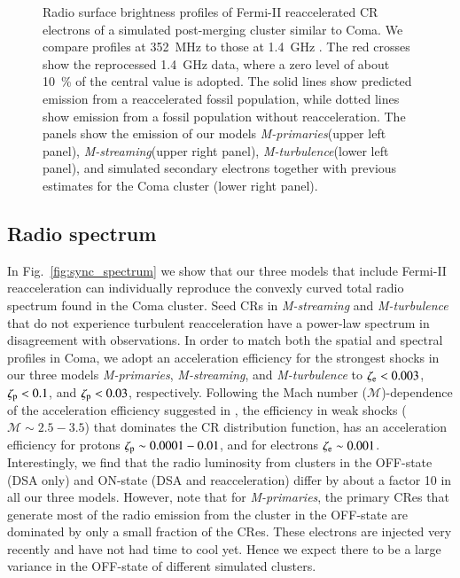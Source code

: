 \documentclass[a4paper,fleqn,usenatbib]{mnras}
\newcommand{\Mstream}{{\it M-streaming}\xspace}
\newcommand{\Mflatturb}{{\it M-turbulence}\xspace}
\newcommand{\Mprimary}{{\it M-primaries}\xspace}
\begin{document}
\begin{figure}
\begin{minipage}{1\columnwidth}
\begin{center}
   \end{center}
\end{minipage}
\caption{Radio surface brightness profiles of Fermi-II reaccelerated
  CR electrons of a simulated post-merging cluster similar to Coma. We
  compare profiles at 352~MHz \citep[blue lines and
    crosses,][]{brown11} to those at 1.4~GHz \citep[green lines and
    crosses,][]{deiss97}. The red crosses show the reprocessed 1.4~GHz
  data, where a zero level of about 10~\% of the central value is
  adopted. The solid lines show predicted emission from a
  reaccelerated fossil population, while dotted lines show emission
  from a fossil population without reacceleration. The panels show the
  emission of our models \Mprimary (upper left panel), \Mstream (upper
  right panel), \Mflatturb (lower left panel), and simulated secondary
  electrons together with previous estimates \citep{brunetti12} for
  the Coma cluster (lower right panel).}
  \label{fig:sync_profile}
\end{figure}

\subsection{Radio spectrum}
In Fig.~\ref{fig:sync_spectrum} we show that our three models that
include Fermi-II reacceleration can individually reproduce the
convexly curved total radio spectrum found in the Coma cluster. Seed
CRs in \Mstream and \Mflatturb that do not experience turbulent
reacceleration have a power-law spectrum in disagreement with
observations. In order to match both the spatial and spectral profiles
in Coma, we adopt an acceleration efficiency for the strongest shocks
in our three models \Mprimary, \Mstream, and \Mflatturb to
$\zeta_{{\mathrm{e}}} <0.003$, $\zeta_{{\mathrm{p}}} < 0.1$, and
$\zeta_{{\mathrm{p}}}<0.03$, respectively. Following the Mach number
($\mathcal{M}$)-dependence of the acceleration efficiency suggested in
\cite{pinzke13}, the efficiency in weak shocks ($\mathcal{M}\sim
2.5-3.5$) that dominates the CR distribution function, has an
acceleration efficiency for protons $\zeta_{{\mathrm{p}}}\sim0.0001-0.01$,
and for electrons $\zeta_{{\mathrm{e}}}\sim 0.001$. Interestingly, we find
that the radio luminosity from clusters in the OFF-state (DSA only)
and ON-state (DSA and reacceleration) differ by about a factor 10 in
all our three models. However, note that for \Mprimary, the primary
CRes that generate most of the radio emission from the cluster in the
OFF-state are dominated by only a small fraction of the CRes. These
electrons are injected very recently and have not had time to cool
yet. Hence we expect there to be a large variance in the OFF-state of
different simulated clusters.
\end{document}
